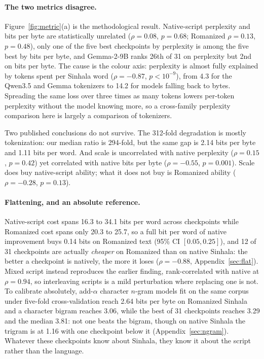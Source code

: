 \documentclass[11pt]{article}
\begin{document}
\paragraph{The two metrics disagree.}
Figure~\ref{fig:metric}(a) is the methodological result. Native-script perplexity and
bits per byte are statistically unrelated ($\rho = 0.08$, $p = 0.68$; Romanized
$\rho = 0.13$, $p = 0.48$), only one of the five best checkpoints by perplexity is among
the five best by bits per byte, and Gemma-2-9B ranks 26th of 31 on perplexity but 2nd on
bits per byte. The cause is the colour axis: perplexity is almost fully explained by
tokens spent per Sinhala word ($\rho = -0.87$, $p < 10^{-9}$), from 4.3 for the Qwen3.5
and Gemma tokenizers to 14.2 for models falling back to bytes. Spreading the same loss
over three times as many tokens lowers per-token perplexity without the model knowing
more, so a cross-family perplexity comparison here is largely a comparison of
tokenizers.

Two published conclusions do not survive. The 312-fold degradation is mostly
tokenization: our median ratio is 294-fold, but the same gap is 2.14 bits per byte and
1.11 bits per word. And scale is uncorrelated with native perplexity
($\rho = 0.15$, $p = 0.42$) yet correlated with native bits per byte
($\rho = -0.55$, $p = 0.001$). Scale does buy native-script ability; what it does not buy
is Romanized ability ($\rho = -0.28$, $p = 0.13$).

\paragraph{Flattening, and an absolute reference.}
Native-script cost spans 16.3 to 34.1 bits per word across checkpoints while Romanized
cost spans only 20.3 to 25.7, so a full bit per word of native improvement buys 0.14
bits on Romanized text (95\% CI $[0.05, 0.25]$), and 12 of 31 checkpoints are actually
\emph{cheaper} on Romanized than on native Sinhala: the better a checkpoint is
natively, the more it loses ($\rho = -0.88$, Appendix~\ref{sec:flat}). Mixed script instead
reproduces the earlier finding, rank-correlated with native at $\rho = 0.94$, so
interleaving scripts is a mild perturbation where replacing one is not. To calibrate
absolutely, add-$\alpha$ character $n$-gram models fit on the same corpus under five-fold
cross-validation reach 2.64 bits per byte on Romanized Sinhala and a character bigram
reaches 3.06, while the best of 31 checkpoints reaches 3.29 and the median 3.81: not one
beats the bigram, though on native Sinhala the trigram is at 1.16 with one checkpoint
below it (Appendix~\ref{sec:ngram}). Whatever these checkpoints know about Sinhala, they
know it about the script rather than the language.
\end{document}
